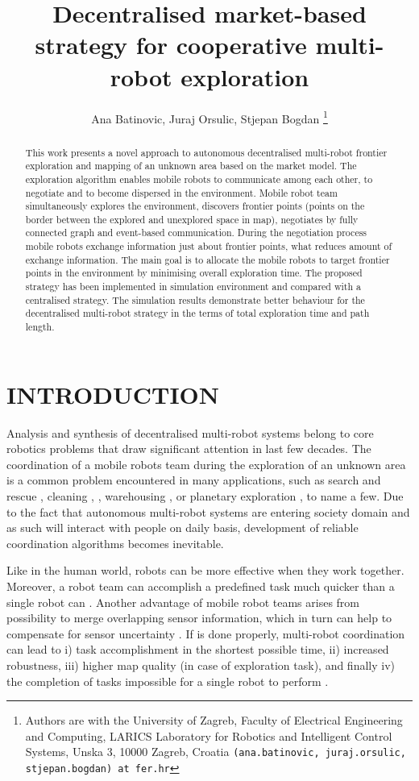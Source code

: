 \documentclass[letterpaper, 10 pt, conference]{ieeeconf}  %
\title{\LARGE \bf
Decentralised market-based strategy for cooperative multi-robot exploration 
}
\author{Ana Batinovic, Juraj Orsulic, Stjepan Bogdan
	\thanks{Authors are with the University of Zagreb, Faculty of Electrical Engineering  and Computing, LARICS Laboratory for Robotics and Intelligent Control Systems, Unska 3, 10000 Zagreb, Croatia
        {\tt\small (ana.batinovic, juraj.orsulic, stjepan.bogdan) at fer.hr}}}%
\begin{document}
\maketitle
\thispagestyle{empty}
\pagestyle{empty}


\begin{abstract}

This work presents a novel approach to autonomous decentralised multi-robot frontier exploration and mapping of an unknown area based on the market model. The exploration algorithm enables mobile robots to communicate among each other, to negotiate and to become dispersed in the environment. Mobile robot team simultaneously explores the environment, discovers frontier points (points on the border between the explored and unexplored space in map), negotiates by fully connected graph and event-based communication. During the negotiation process mobile robots exchange information just about frontier points, what reduces amount of exchange information. The main goal is to allocate the mobile robots to target frontier points in the environment by minimising overall exploration time. The proposed strategy has been implemented in simulation environment and compared with a centralised strategy. The simulation results demonstrate better behaviour for the decentralised multi-robot strategy in the terms of total exploration time and path length. 

\end{abstract}

 
\section{INTRODUCTION}
Analysis and synthesis of decentralised multi-robot systems belong to core robotics problems that draw significant attention in last few decades. The coordination of a mobile robots team during the exploration of an unknown area is a common problem encountered in many applications, such as search and rescue \cite{rescue}, cleaning \cite{cleaning1}, \cite{cleaning2}, warehousing \cite{Wurman}, or planetary exploration \cite{planetary}, to name a few. Due to the fact that autonomous multi-robot systems are entering society domain and as such will interact with people on daily basis, development of reliable coordination algorithms becomes inevitable.

 Like in the human world, robots can be more effective when they work together. Moreover, a robot team can accomplish a predefined task much quicker than a single robot can \cite{free-market}. Another advantage of mobile robot teams arises from possibility to merge overlapping sensor information, which in turn can help to compensate for sensor uncertainty \cite{segmentation}.
If is done properly, multi-robot coordination can lead to i) task accomplishment in the shortest possible time, ii) increased robustness, iii) higher map quality (in case of exploration task), and finally iv) the completion of tasks impossible for a single robot to perform \cite{survey-analysis}.
\end{document}
